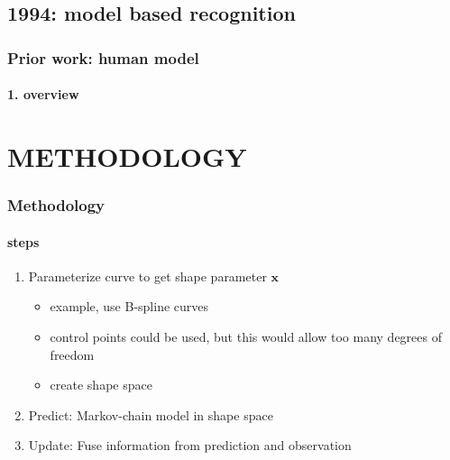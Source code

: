 \subsection{1994: model based recognition} 
\begin{frame}
\frametitle{Prior work: human model}
\framesubtitle{1. overview}
\logoCSIPCPL\mypagenum
{}
\end{frame}















\section{METHODOLOGY}
\begin{frame}
\frametitle{Methodology}
\framesubtitle{steps}
\logoCSIPCPL\mypagenum
	\begin{enumerate}
		\item Parameterize curve to get shape parameter $\mathbf{x}$
			\begin{itemize}
				\item example, use B-spline curves
				\item control points could be used, but this would allow too many degrees of freedom
				\item create shape space
			\end{itemize}
		\item Predict: Markov-chain model in shape space
		\item Update: Fuse information from prediction and observation
	\end{enumerate}
\end{frame}



\printbibliography

